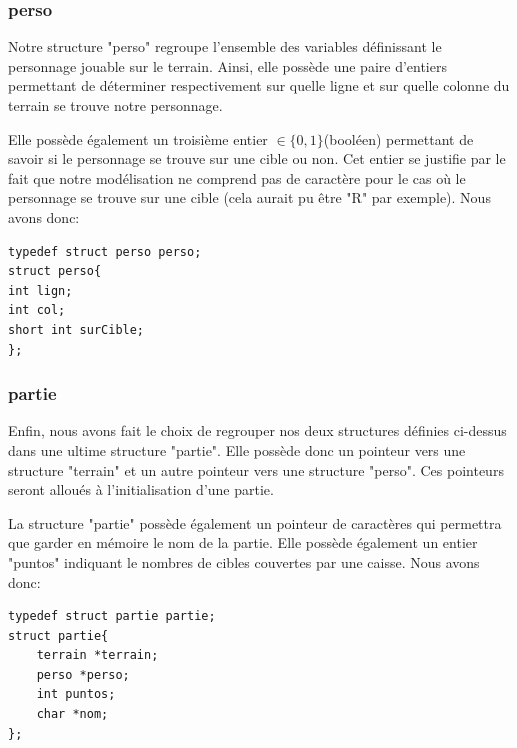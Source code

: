 \documentclass[10pt,a4paper,french,titlepage]{article}
\begin{document}
\subsubsection{perso}
Notre structure "perso" regroupe l'ensemble des variables définissant le personnage jouable sur le terrain. Ainsi, elle possède une paire d'entiers permettant de déterminer respectivement sur quelle ligne et sur quelle colonne du terrain se trouve notre personnage. 

Elle possède également un troisième entier $\in \{0,1\}$(booléen) permettant de savoir si le personnage se trouve sur une cible ou non. Cet entier se justifie par le fait que notre modélisation ne comprend pas de caractère pour le cas où le personnage se trouve sur une cible (cela aurait pu être "R" par exemple). Nous avons donc:
\begin{lstlisting}
typedef struct perso perso;
struct perso{
int lign;
int col;
short int surCible;
};
\end{lstlisting}
\subsubsection{partie}
Enfin, nous avons fait le choix de regrouper nos deux structures définies ci-dessus dans une ultime structure "partie". Elle possède donc un pointeur vers une structure "terrain" et un autre pointeur vers une structure "perso". Ces pointeurs seront alloués à l'initialisation d'une partie.

La structure "partie" possède également un pointeur de caractères qui permettra que garder en mémoire le nom de la partie. Elle possède également un entier "puntos" indiquant le nombres de cibles couvertes par une caisse. Nous avons donc:
\begin{lstlisting}
typedef struct partie partie;
struct partie{
    terrain *terrain;
    perso *perso;
    int puntos;
    char *nom;
};
\end{lstlisting}
\end{document}
